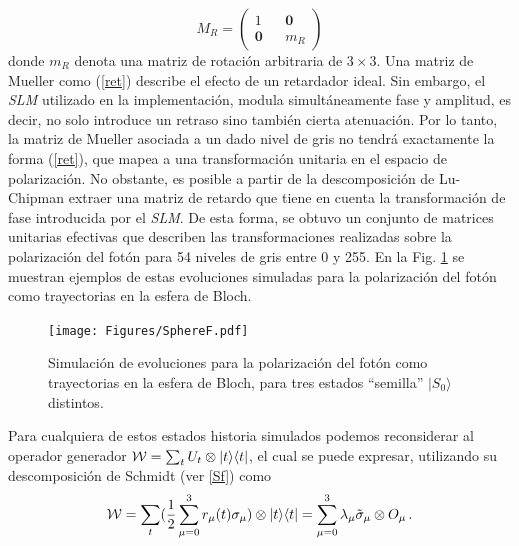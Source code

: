 \begin{equation}
M_R=\begin{pmatrix}
    1&&\bm 0\\
    \bm 0&& m_R 
    \end{pmatrix} \label{ret}
\end{equation}
donde $m_R$ denota una matriz de rotación arbitraria de $3\times 3$.
Una matriz de Mueller como (\ref{ret}) describe
el efecto de un retardador ideal. Sin embargo, el {\it  SLM}
utilizado en la implementación, modula simultáneamente fase y amplitud, es decir,  
no solo introduce un retraso sino también cierta  atenuación. Por lo tanto, la matriz de Mueller asociada a un dado nivel de gris no tendrá exactamente la forma (\ref{ret}), 
que mapea a una transformación unitaria en el espacio de polarización. No obstante, es posible a partir de la descomposición de Lu-Chipman \cite{Lu.96} extraer una matriz de retardo que tiene en cuenta la transformación de fase introducida por el {\it SLM}.
De esta forma, se obtuvo un conjunto de matrices unitarias efectivas que describen las transformaciones realizadas sobre la polarización del fotón para 54 niveles de gris entre 0 y 255. 
En la Fig. \ref{fig:sphere2} se muestran ejemplos de estas evoluciones simuladas para la polarización del fotón como trayectorias en la esfera de Bloch.

\begin{figure}[htp]
\centering
\texttt{[image: Figures/SphereF.pdf]}
\caption{Simulación de evoluciones para la polarización del fotón como trayectorias en la esfera de Bloch, para tres estados ``semilla'' $|S_0\rangle$ distintos.}
\label{fig:sphere2}
\end{figure}



Para cualquiera de estos estados historia simulados podemos reconsiderar al 
operador generador ${\cal W}=\sum_t U_t\otimes |t\rangle\langle t|$, el cual se puede expresar, utilizando su descomposición de Schmidt (ver \ref{Sf})  como 
\begin{equation}
{\cal W}=\sum_t (\frac{1}{2} \sum_{\mu=0}^{3} r_{\mu}(t) \sigma_{\mu}) \otimes |t\rangle\langle t|=\sum_{\mu=0}^{3} \lambda_{\mu}\tilde{\sigma}_{\mu}\otimes O_{\mu}\,.
\end{equation}

